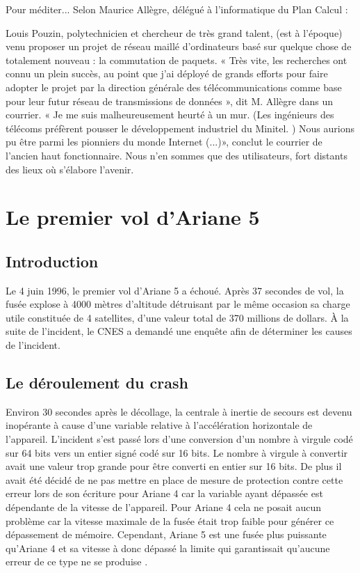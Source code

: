 \documentclass[12pt]{report}
\begin{document}
Pour méditer... Selon Maurice Allègre, délégué à l'informatique du Plan Calcul :

\og Louis Pouzin, polytechnicien et chercheur de très grand talent, (est à l'époque) venu proposer un projet de réseau maillé d'ordinateurs basé sur quelque chose de totalement nouveau : la commutation de paquets. « Très vite, les recherches ont connu un plein succès, au point que j'ai déployé de grands efforts pour faire adopter le projet par la direction générale des télécommunications comme base pour leur futur réseau de transmissions de données », dit M. Allègre dans un courrier. « Je me suis malheureusement heurté à un mur. (Les ingénieurs des télécoms préfèrent pousser le développement industriel du Minitel. ) Nous aurions pu être parmi les pionniers du monde Internet (...)», conclut le courrier de l'ancien haut fonctionnaire. Nous n'en sommes que des utilisateurs, fort distants des lieux où s'élabore l'avenir. \fg\cite{wikipouzin}


\chapter{Le premier vol d'Ariane 5}

\section{Introduction}

Le 4 juin 1996, le premier vol d'Ariane 5 a échoué. Après 37 secondes de vol, la fusée explose à 4000 mètres d'altitude 
détruisant par le même occasion sa charge utile constituée de 4 satellites, d'une valeur total de 370 millions de dollars.
À la suite de l'incident, le CNES a demandé une enquête afin de déterminer les causes de l'incident.

\section{Le déroulement du crash}

Environ 30 secondes après le décollage, la centrale à inertie de secours est devenu inopérante à cause d'une variable relative à l'accélération horizontale de l'appareil. L'incident s'est passé lors d'une conversion    
d'un nombre à virgule codé sur 64 bits vers un entier signé codé sur 16 bits. Le nombre à virgule à convertir avait une valeur trop grande pour être converti en entier sur 16 bits. De plus il avait été décidé de ne pas mettre en place de mesure de protection contre cette erreur lors de son écriture pour Ariane 4 car la variable ayant dépassée est dépendante de la vitesse de l'appareil. Pour Ariane 4 cela ne posait aucun problème car la vitesse maximale de la fusée était trop faible pour générer ce dépassement de mémoire. Cependant, Ariane 5 est une fusée plus puissante qu'Ariane 4 et sa vitesse à donc dépassé la limite qui garantissait qu'aucune erreur de ce type ne se produise \cite{ariane}.
\end{document}

